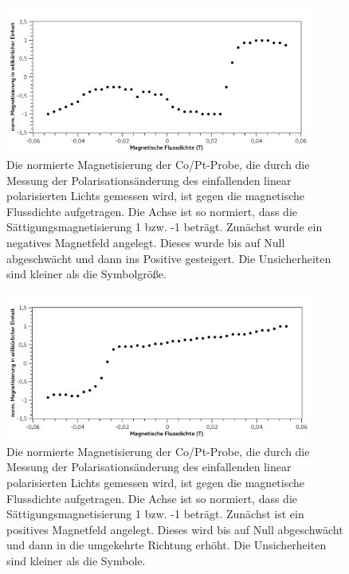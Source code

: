 \documentclass[
	a4paper,
	12pt,
	pagesize,
	ngerman
]{scrartcl}
\begin{document}
	\begin{figure}[H]  
		\includegraphics[width=0.90\textwidth]{fig_magn1} %
		\centering
		\caption{Die normierte Magnetisierung der Co/Pt-Probe, die durch die Messung der Polarisationsänderung des einfallenden linear polarisierten Lichts gemessen wird, ist gegen die magnetische Flussdichte aufgetragen. 
		Die Achse ist so normiert, dass die Sättigungsmagnetisierung 1 bzw. -1 beträgt.
		Zunächst wurde ein negatives Magnetfeld angelegt. 
		Dieses wurde bis auf Null abgeschwächt und dann ins Positive gesteigert. 
		Die Unsicherheiten sind kleiner als die Symbolgröße.} 
		\label{fig_magn1}
		\centering
	\end{figure}
	
	\begin{figure}[H] 
		\includegraphics[width=0.90\textwidth]{fig_magn2}
		\centering
		\caption{Die normierte Magnetisierung der Co/Pt-Probe, die durch die Messung der Polarisationsänderung des einfallenden linear polarisierten Lichts gemessen wird, ist gegen die magnetische Flussdichte aufgetragen. 
		Die Achse ist so normiert, dass die Sättigungsmagnetisierung 1 bzw. -1 beträgt.
		Zunächst ist ein positives Magnetfeld angelegt. 
		Dieses wird bis auf Null abgeschwächt und dann in die umgekehrte Richtung erhöht.
		Die Unsicherheiten sind kleiner als die Symbole.} 
		\label{fig_magn2}
		\centering
	\end{figure}
\end{document}
